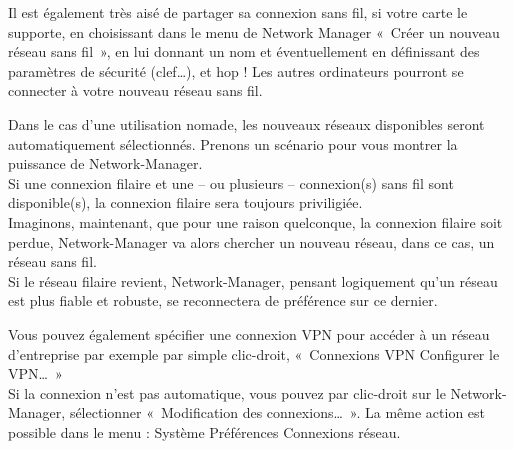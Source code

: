 Il est également très aisé de partager sa connexion sans fil, si votre carte  le supporte, en choisissant dans le menu de Network Manager «~Créer un nouveau réseau sans fil~», en lui donnant un nom et éventuellement en définissant des paramètres de sécurité (clef\ldots{}), et hop ! Les autres ordinateurs pourront se connecter à votre nouveau réseau sans fil.
\begin{nota}
Dans le cas d'une utilisation nomade, les nouveaux réseaux disponibles seront automatiquement sélectionnés. Prenons un scénario pour vous montrer la puissance de Network-Manager.\\
Si une connexion filaire et une -- ou plusieurs -- connexion(s) sans fil sont disponible(s), la connexion filaire sera toujours priviligiée.\\
Imaginons, maintenant, que pour une raison quelconque, la connexion filaire soit perdue, Network-Manager va alors chercher un nouveau réseau, dans ce cas, un réseau sans fil.\\
Si le réseau filaire revient, Network-Manager, pensant logiquement qu'un réseau  est plus fiable et robuste, se reconnectera de préférence sur ce dernier.\par
\GestionReseauNM
\end{nota}
Vous pouvez également spécifier une connexion VPN pour accéder à un réseau d'entreprise par exemple par simple clic-droit, «~Connexions VPN \FlecheDroite Configurer le VPN\ldots{}~»\\
Si la connexion n'est pas automatique, vous pouvez par clic-droit sur le Network-Manager, sélectionner «~Modification des connexions\ldots{}~». La même action est possible dans le menu : Système \FlecheDroite Préférences \FlecheDroite Connexions réseau.
